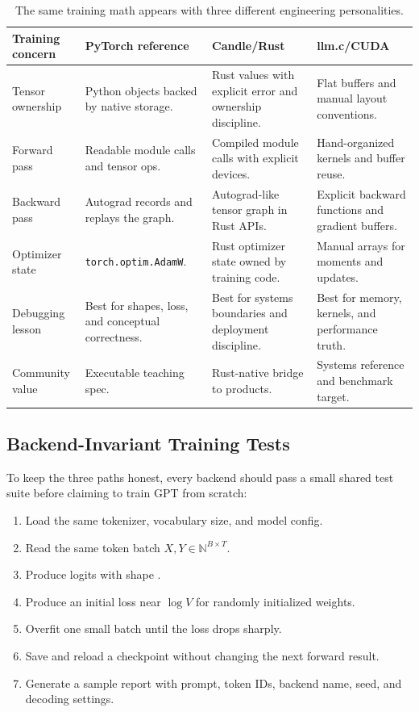\begin{table}[htbp]
\centering
\small
\renewcommand{\arraystretch}{1.25}
\begin{tabular}{p{}p{}p{}p{}}
\toprule
\textbf{Training concern} & \textbf{PyTorch reference} & \textbf{Candle/Rust} & \textbf{llm.c/CUDA} \\
\midrule
Tensor ownership &
Python objects backed by native storage. &
Rust values with explicit error and ownership discipline. &
Flat buffers and manual layout conventions. \\
Forward pass &
Readable module calls and tensor ops. &
Compiled module calls with explicit devices. &
Hand-organized kernels and buffer reuse. \\
Backward pass &
Autograd records and replays the graph. &
Autograd-like tensor graph in Rust APIs. &
Explicit backward functions and gradient buffers. \\
Optimizer state &
\texttt{torch.optim.AdamW}. &
Rust optimizer state owned by training code. &
Manual arrays for moments and updates. \\
Debugging lesson &
Best for shapes, loss, and conceptual correctness. &
Best for systems boundaries and deployment discipline. &
Best for memory, kernels, and performance truth. \\
Community value &
Executable teaching spec. &
Rust-native bridge to products. &
Systems reference and benchmark target. \\
\bottomrule
\end{tabular}
\caption{The same training math appears with three different engineering personalities.}
\end{table}

\subsection{Backend-Invariant Training Tests}

To keep the three paths honest, every backend should pass a small shared test suite before
claiming to train GPT from scratch:

\begin{enumerate}
  \item Load the same tokenizer, vocabulary size, and model config.
  \item Read the same token batch \(X,Y \in \mathbb{N}^{B\times T}\).
  \item Produce logits with shape \shape{[B,T,V]}.
  \item Produce an initial loss near \(\log V\) for randomly initialized weights.
  \item Overfit one small batch until the loss drops sharply.
  \item Save and reload a checkpoint without changing the next forward result.
  \item Generate a sample report with prompt, token IDs, backend name, seed, and decoding settings.
\end{enumerate}

